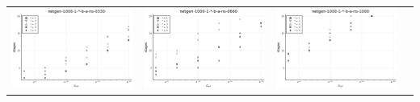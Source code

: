 \documentclass{article}
\begin{document}
\begin{landscape}
\begin{center}
\begin{longtable}{| c | c | c | c |}
\includegraphics[height=0.22\textheight]{hiter_fixlim_netgen-1000-1-_-b-a-ns-0330.png} &
\includegraphics[height=0.22\textheight]{hiter_fixlim_netgen-1000-1-_-b-a-ns-0660.png} &
\includegraphics[height=0.22\textheight]{hiter_fixlim_netgen-1000-1-_-b-a-ns-1000.png} \\

\end{longtable}
\end{center}
\end{landscape}
\end{document}
